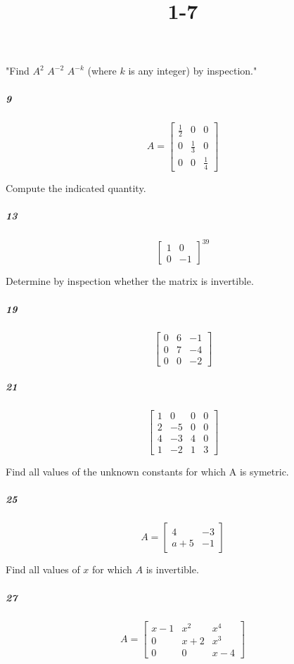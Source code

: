 \documentclass[fleqn]{article}
\title{1-7}
\begin{document}
\maketitle
\pagebreak
 "Find $A^2$  $A^{-2}$  $A^{-k}$ (where $k$ is any integer) by inspection."

\subparagraph{9}

\[
A = \begin{bmatrix} \frac{1}{2} & 0 & 0\\ 0 & \frac{1}{3} & 0\\ 0 & 0 & \frac{1}{4} \end{bmatrix}
\]
\vfill

 Compute the indicated quantity.

\subparagraph{13}

\[
\begin{bmatrix} 1 & 0 \\ 0 & -1 \end{bmatrix}^{39}
\]
\vfill


\pagebreak
 Determine by inspection whether the matrix is invertible.

\subparagraph{19}

\[
\begin{bmatrix} 0 & 6 & -1 \\ 0 & 7 & -4 \\ 0 & 0 & -2 \end{bmatrix}
\]
\vfill



\subparagraph{21}

\[
\begin{bmatrix} 1 & 0 & 0 & 0 \\ 2 & -5 & 0 & 0 \\ 4 & -3 & 4 & 0 \\ 1 & -2 & 1 & 3 \end{bmatrix}
\]
\vfill


\pagebreak
 Find all values of the unknown constants for which A is symetric.

\subparagraph{25}

\[
A = \begin{bmatrix} 4 & -3 \\ a+5 & -1 \end{bmatrix}
\]
\vfill

 Find all values of $x$ for which $A$ is invertible.

\subparagraph{27}

\[
A = \begin{bmatrix} x-1 & x^2 & x^4 \\ 0 & x+2 & x^3 \\ 0 & 0 & x-4 \end{bmatrix}
\]
\vfill


\pagebreak
\end{document}
